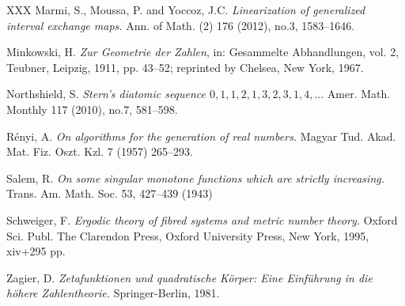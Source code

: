 \documentclass[letterpaper,10pt,reqno]{amsart}
\numberwithin{equation}{section}     %
\begin{document}
\begin{thebibliography}{XXX}
 Marmi, S., Moussa, P. and  Yoccoz, J.C.  \emph{Linearization of generalized interval exchange maps.} Ann. of Math. (2) 176 (2012), no.3, 1583--1646.


 Minkowski, H. \emph{Zur Geometrie der Zahlen}, in: Gesammelte Abhandlungen, vol. 2, Teubner, Leipzig, 1911, pp. 43--52; reprinted by Chelsea, New York, 1967.


 Northshield, S. \emph{Stern's diatomic sequence $0,1,1,2,1,3,2,3,1,4,...$}
Amer. Math. Monthly 117 (2010), no.7, 581--598.

 R\'enyi, A. \emph{On algorithms for the generation of real numbers.} Magyar Tud. Akad. Mat. Fiz. Oszt. Kzl.  7  (1957) 265--293.


  Salem, R. \emph{On some singular monotone functions which are strictly increasing.} Trans. Am. Math. Soc.
53, 427--439 (1943)


  Schweiger, F.  \emph{Ergodic theory of fibred systems and metric number theory.}
Oxford Sci. Publ. The Clarendon Press, Oxford University Press, New York, 1995, xiv+295 pp.


  Zagier, D. \emph{Zetafunktionen und quadratische K\"orper: Eine Einf\"uhrung in die h\"ohere Zahlentheorie.} Springer-Berlin, 1981.

\end{thebibliography}
\end{document}
